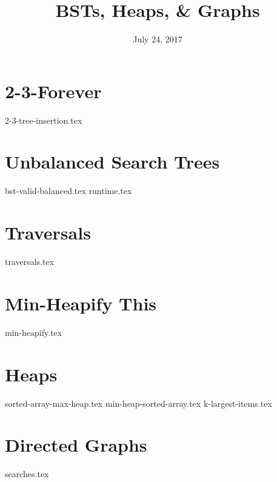 \documentclass{exam}
\title{BSTs, Heaps, \& Graphs}
\date{July 24, 2017}
\begin{document}
\maketitle

\section{2-3-Forever}
\begin{questions}
{2-3-tree-insertion.tex}
\end{questions}

\section{Unbalanced Search Trees}
\begin{questions}
{bst-valid-balanced.tex}
\clearpage
{runtime.tex}
\end{questions}

\section{Traversals}
\begin{questions}
{traversals.tex}
\end{questions}

\clearpage

\section{Min-Heapify This}
\marginpar{\vspace{0in}{example-tree.tex}}
\begin{questions}
{min-heapify.tex}
\end{questions}

\section{Heaps}
\begin{questions}
{sorted-array-max-heap.tex}
{min-heap-sorted-array.tex}
{k-largest-items.tex}
\end{questions}

\clearpage

\section{Directed Graphs}
\begin{questions}
{searches.tex}
\end{questions}
\end{document}
